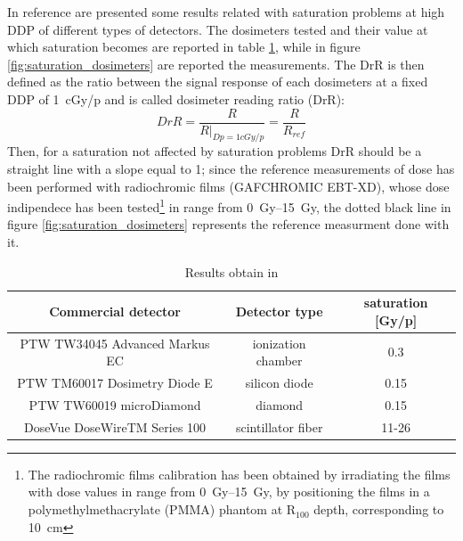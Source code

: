             In reference \cite{FLASH_dosimeters} are presented some results related with saturation problems at high DDP of different types of detectors. The dosimeters tested and their value at which saturation becomes are reported in table \ref{tab:dosimeters_saturation}, while in figure \ref{fig:saturation_dosimeters} are reported the measurements. 
            The DrR is then defined as the ratio between the signal response of each dosimeters at a fixed DDP of \SI{1}{cGy/p} and is called dosimeter reading ratio (DrR): 
            \begin{equation}
                DrR = \frac{R}{R|_{Dp = 1cGy/p}} = \frac{R}{R_{ref}}
            \end{equation} 
            Then, for a saturation not affected by saturation problems DrR should be a straight line with a slope equal to 1; since the  reference measurements of dose has been performed with radiochromic films (GAFCHROMIC EBT-XD), whose dose indipendece has been tested\footnote{The radiochromic films calibration has been obtained by irradiating the films with dose values in range from \SIrange{0}{15}{Gy}, by positioning the films in a polymethylmethacrylate (PMMA) phantom at R$_{100}$ depth, corresponding to \SI{10}{cm}} in range from \SIrange{0}{15}{Gy}, the dotted black line in figure \ref{fig:saturation_dosimeters} represents the reference measurment done with it. 
            \begin{table}
                \begin{center}
                \begin{tabular}{|c | c |c |}
                \hline
                Commercial detector & Detector type & saturation [Gy/p]\\
                \hline
                \hline
                PTW TW34045 Advanced Markus EC & ionization chamber & 0.3 \\
                PTW TM60017 Dosimetry Diode E & silicon diode & 0.15\\
                PTW TW60019 microDiamond & diamond  &  0.15 \\
                DoseVue DoseWireTM Series 100 & scintillator fiber & 11-26\\
                \hline
                \end{tabular}
                \caption{Results obtain in \cite{FLASH_dosimeters}}
                \label{tab:dosimeters_saturation}
                \end{center}
            \end{table}

